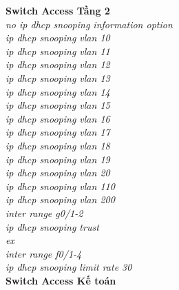 \documentclass[12pt,a4paper]{report}
\begin{document}
\hspace*{1cm}\textbf{Switch Access Tầng 2}\\
\hspace*{2cm}\textit{no ip dhcp snooping information option\\
\hspace*{2cm}ip dhcp snooping vlan 10\\
\hspace*{2cm}ip dhcp snooping vlan 11\\
\hspace*{2cm}ip dhcp snooping vlan 12\\
\hspace*{2cm}ip dhcp snooping vlan 13\\
\hspace*{2cm}ip dhcp snooping vlan 14\\
\hspace*{2cm}ip dhcp snooping vlan 15\\
\hspace*{2cm}ip dhcp snooping vlan 16\\
\hspace*{2cm}ip dhcp snooping vlan 17\\
\hspace*{2cm}ip dhcp snooping vlan 18\\
\hspace*{2cm}ip dhcp snooping vlan 19\\
\hspace*{2cm}ip dhcp snooping vlan 20\\
\hspace*{2cm}ip dhcp snooping vlan 110\\
\hspace*{2cm}ip dhcp snooping vlan 200\\
\hspace*{2cm}inter range g0/1-2\\
\hspace*{2cm}ip dhcp snooping trust\\
\hspace*{2cm}ex\\
\hspace*{2cm}inter range f0/1-4\\
\hspace*{2cm}ip dhcp snooping limit rate 30\\}
\hspace*{1cm}\textbf{Switch Access Kế toán}\\
\end{document}
